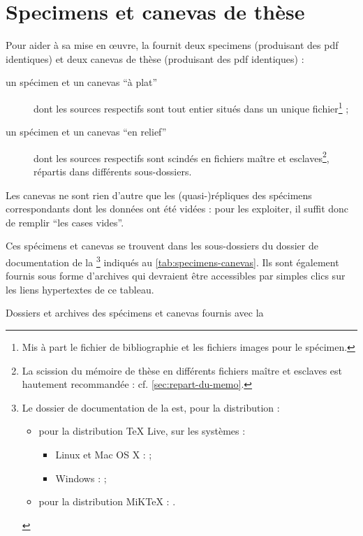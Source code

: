\chapter{Specimens et canevas de thèse}\label{cha:specimen-canevas}%

Pour aider à sa mise en œuvre, la \yatcl fournit deux specimens (produisant des
\acrshort{pdf} identiques) et deux canevas de thèse (produisant des
\acrshort{pdf} identiques) :
\begin{description}
\item[un spécimen et un canevas \enquote{à plat}] dont les sources 
  respectifs sont tout entier situés dans un unique fichier\footnote{Mis à part
    le fichier de bibliographie et les fichiers images pour le spécimen.} ;
\item[un spécimen et un canevas \enquote{en relief}] dont les sources
   respectifs sont scindés en fichiers maître et
  esclaves\footnote{La scission du mémoire de thèse en différents fichiers
    maître et esclaves est hautement recommandée :
    cf. \vref{sec:repart-du-memo}.}, répartis dans différents sous-dossiers.
\end{description}
Les canevas ne sont rien d'autre que les (quasi-)répliques des spécimens
correspondants dont les données ont été vidées : pour les exploiter, il suffit
donc de remplir \enquote{les cases vides}.

Ces spécimens et canevas se trouvent dans les sous-dossiers du dossier de
documentation de la \yatcl{}\footnote{Le dossier de documentation de la
  \yatcl{} est, pour la distribution :
  \begin{itemize}
  \item pour la distribution \TeX{} Live\versiontl, sur les systèmes :
    \begin{itemize}
    \item Linux et Mac OS X :
      \href{./.}{\directory{\unixtldirectory\tldistdirectory\jobdocdirectory/}} ;
    \item Windows :
      \href{./.}{\directory{\wintldirectory\tldistdirectory\jobdocdirectory/}} ;
    \end{itemize}
  \item pour la distribution MiK\TeX{} : \directory{\miktexdistdirectory}.
  \end{itemize}
  \label{fn:yathesisdocfolder}} indiqués au \vref{tab:specimens-canevas}. Ils
sont également fournis sous forme d'archives  qui devraient être
accessibles par simples clics sur les liens hypertextes de ce tableau.
\begin{table}
  \centering
  
  \caption{Dossiers et archives  des spécimens et canevas fournis
    avec la \yatcl{}}
  \label{tab:specimens-canevas}
\end{table}

